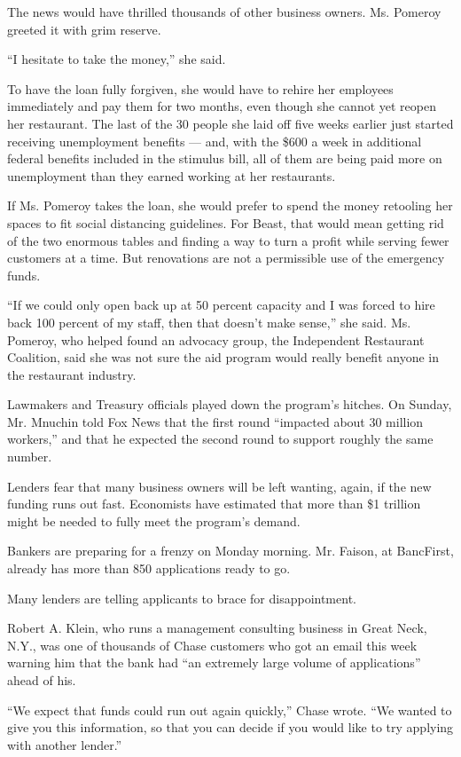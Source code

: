The news would have thrilled thousands of other business owners. Ms.
Pomeroy greeted it with grim reserve.

``I hesitate to take the money,'' she said.

To have the loan fully forgiven, she would have to rehire her employees
immediately and pay them for two months, even though she cannot yet
reopen her restaurant. The last of the 30 people she laid off five weeks
earlier just started receiving unemployment benefits --- and, with the
\$600 a week in additional federal benefits included in the stimulus
bill, all of them are being paid more on unemployment than they earned
working at her restaurants.

If Ms. Pomeroy takes the loan, she would prefer to spend the money
retooling her spaces to fit social distancing guidelines. For Beast,
that would mean getting rid of the two enormous tables and finding a way
to turn a profit while serving fewer customers at a time. But
renovations are not a permissible use of the emergency funds.

``If we could only open back up at 50 percent capacity and I was forced
to hire back 100 percent of my staff, then that doesn't make sense,''
she said. Ms. Pomeroy, who helped found an advocacy group, the
Independent Restaurant Coalition, said she was not sure the aid program
would really benefit anyone in the restaurant industry.

Lawmakers and Treasury officials played down the program's hitches. On
Sunday, Mr. Mnuchin told Fox News that the first round ``impacted about
30 million workers,'' and that he expected the second round to support
roughly the same number.

Lenders fear that many business owners will be left wanting, again, if
the new funding runs out fast. Economists have estimated that more than
\$1 trillion might be needed to fully meet the program's demand.

Bankers are preparing for a frenzy on Monday morning. Mr. Faison, at
BancFirst, already has more than 850 applications ready to go.

Many lenders are telling applicants to brace for disappointment.

Robert A. Klein, who runs a management consulting business in Great
Neck, N.Y., was one of thousands of Chase customers who got an email
this week warning him that the bank had ``an extremely large volume of
applications'' ahead of his.

``We expect that funds could run out again quickly,'' Chase wrote. ``We
wanted to give you this information, so that you can decide if you would
like to try applying with another lender.''

